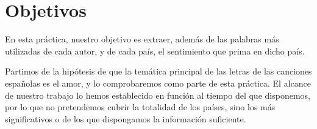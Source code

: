 \chapter{Objetivos}
\label{cap:Objetivos}

En esta práctica, nuestro objetivo es extraer, además de las palabras más utilizadas de cada autor, y de cada país, el sentimiento que prima en dicho país.

 Partimos de la hipótesis de que la temática principal de las letras de las canciones españolas es el amor, y lo comprobaremos como parte de esta práctica. El alcance de nuestro trabajo lo hemos establecido en función al tiempo del que disponemos, por lo que no pretendemos cubrir la totalidad de los países, sino los más significativos o de los que dispongamos la información suficiente. 